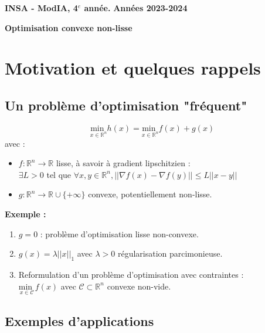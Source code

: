 \documentclass[12pt,a4paper]{article}
\newcommand{\entete}{
    \noindent\textbf{INSA - ModIA, 4$^e$ année.}
    \hfill \textbf{Années 2023-2024}
    
    \begin{center}
        \textbf{\LARGE Optimisation convexe non-lisse}
    \end{center}
}
\begin{document}
\entete

\vspace{0.5cm}


\section{Motivation et quelques rappels}

\subsection{Un problème d'optimisation "fréquent"}

\begin{tcolorbox}[colback=red!10!white,colframe=red!30!black]
    \begin{equation}
        \underset{x \in \mathbb{R}^n}{\text{min }} h(x) = \underset{x \in \mathbb{R}^n}{\text{min }} f(x) + g(x)
    \end{equation}
    avec :
    \begin{itemize}
        \item $f : \mathbb{R}^n \rightarrow \mathbb{R}$ lisse, à savoir à gradient lipschitzien :\\
        $\exists L > 0$ tel que $\forall x, y \in \mathbb{R}^n, ||\nabla f(x) - \nabla f(y)|| \leq L ||x - y||$
        \item $g : \mathbb{R}^n \rightarrow \mathbb{R} \cup \{+\infty\}$ convexe, potentiellement non-lisse.
    \end{itemize}
\end{tcolorbox}


\noindent\textbf{Exemple :}
\begin{enumerate}[label=\roman*)]
    \item $g = 0$ : problème d'optimisation lisse non-convexe.
    \item $g(x) = \lambda ||x||_1$ avec $\lambda > 0$ régularisation parcimonieuse.
    \item Reformulation d'un problème d'optimisation avec contraintes :\\
    $\underset{x \in \mathcal{C}}{\text{min }} f(x)$ avec $\mathcal{C} \subset \mathbb{R}^n$ convexe non-vide.\\
\end{enumerate}


\subsection{Exemples d'applications}
\end{document}
